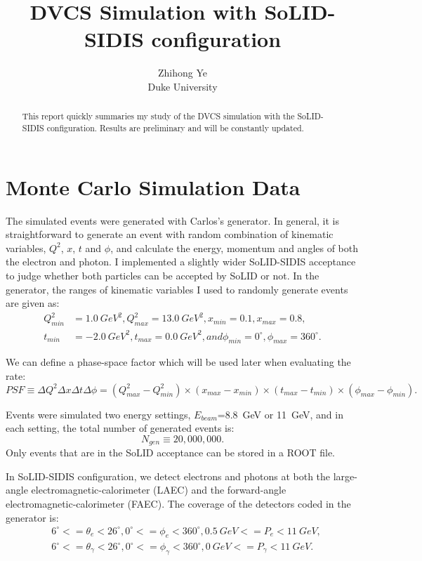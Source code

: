 \documentclass[a4paper,10.5pt]{article}
\title{DVCS Simulation with SoLID-SIDIS configuration}
\author{Zhihong Ye \\ Duke University}
\begin{document}
\maketitle
\begin{abstract}
   This report quickly summaries my study of the DVCS simulation with the SoLID-SIDIS configuration. Results are preliminary and will be constantly updated.
\end{abstract}

\section{Monte Carlo Simulation Data}
  The simulated events were generated with Carlos's generator. In general, it is straightforward to generate an event with random combination of kinematic variables, $Q^{2}$, $x$, $t$ and $\phi$, and calculate the energy, momentum and angles of both the electron and photon. I implemented a slightly wider SoLID-SIDIS acceptance to judge whether both particles can be accepted by SoLID or not. In the generator, the ranges of kinematic variables I used to randomly generate events are given as:
 \begin{equation}
    \begin{align*}
    Q^{2}_{min} &= 1.0~GeV^{2},  Q^{2}_{max} = 13.0~GeV^{2}, x_{min} = 0.1, x_{max} = 0.8,\\
    t_{min} &= -2.0~GeV^{2}, t_{max} = 0.0~GeV^{2}, and \phi_{min}=0^{\circ}, \phi_{max} = 360^{\circ}.    
  \end{align*}
 \end{equation}

 We can define a phase-space factor which will be used later when evaluating the rate:
 \begin{equation}
    PSF \equiv \Delta Q^{2}\Delta x \Delta t \Delta \phi = (Q^{2}_{max}-Q^{2}_{min})\times(x_{max}-x_{min})\times(t_{max}-t_{min})\times(\phi_{max}-\phi_{min}).
    \label{psf}
 \end{equation}

 Events were simulated two energy settings, $E_{beam}$=8.8~GeV or 11~GeV, and in each setting, the total number of generated events is:
 \begin{equation}
     N_{gen} \equiv 20,000,000.
     \label{ngen}
 \end{equation}
 Only events that are in the SoLID acceptance can be stored in a ROOT file.

 In SoLID-SIDIS configuration, we detect electrons and photons at both the large-angle electromagnetic-calorimeter (LAEC) and the forward-angle electromagnetic-calorimeter (FAEC). The coverage of the detectors coded in the generator is:
  \begin{equation}
     \begin{align*}
       &6^{\circ}<=\theta_{e}<26^{\circ}, 0^{\circ}<=\phi_{e}<360^{\circ}, 0.5~GeV<=P_{e}<11~GeV,\\
       &6^{\circ}<=\theta_{\gamma}<26^{\circ}, 0^{\circ}<=\phi_{\gamma}<360^{\circ}, 0~GeV<=P_{\gamma}<11~GeV.
     \end{align*}
  \end{equation}
\end{document}
